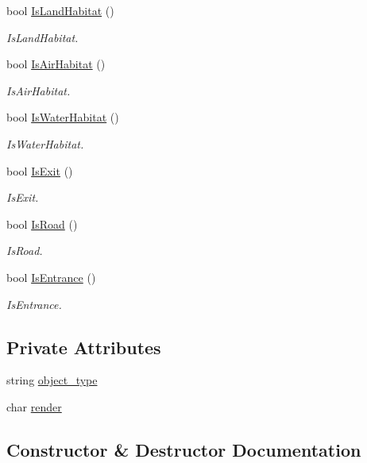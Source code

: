 \begin{DoxyCompactItemize}
bool \hyperlink{classCell_a87c65d914c0be7928836fe8c46b5408e}{Is\+Land\+Habitat} ()
\begin{DoxyCompactList}\small\item\em Is\+Land\+Habitat. \end{DoxyCompactList}\item 
bool \hyperlink{classCell_af270b6bea6287714d585bae539edebc8}{Is\+Air\+Habitat} ()
\begin{DoxyCompactList}\small\item\em Is\+Air\+Habitat. \end{DoxyCompactList}\item 
bool \hyperlink{classCell_a06f065280a20d0008af9980ac4e053d0}{Is\+Water\+Habitat} ()
\begin{DoxyCompactList}\small\item\em Is\+Water\+Habitat. \end{DoxyCompactList}\item 
bool \hyperlink{classCell_a01c619a613088130f13c7d090121cbf5}{Is\+Exit} ()
\begin{DoxyCompactList}\small\item\em Is\+Exit. \end{DoxyCompactList}\item 
bool \hyperlink{classCell_aaaabb185d3c3d8ae23ac70dbc1148768}{Is\+Road} ()
\begin{DoxyCompactList}\small\item\em Is\+Road. \end{DoxyCompactList}\item 
bool \hyperlink{classCell_a15995ac65537db9e5bd3e6e1df7476e3}{Is\+Entrance} ()
\begin{DoxyCompactList}\small\item\em Is\+Entrance. \end{DoxyCompactList}\end{DoxyCompactItemize}
\subsection*{Private Attributes}
\begin{DoxyCompactItemize}
\item 
string \hyperlink{classCell_a800313ab2d6d6686a999e0179695737f}{object\+\_\+type}
\item 
char \hyperlink{classCell_a886f694017e919827f9208d17d3836d3}{render}
\end{DoxyCompactItemize}


\subsection{Constructor \& Destructor Documentation}

